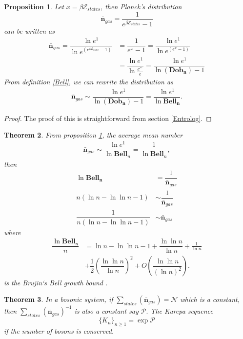 \documentclass[pdflatex,sn-mathphys-num]{sn-jnl}%
\newtheorem{theorem}{Theorem}
\theoremstyle{thmstyleone}%
\newtheorem{proposition}[theorem]{Proposition}%
\theoremstyle{thmstyletwo}%
\theoremstyle{thmstylethree}%
\begin{document}
\begin{proposition}\label{planck}
Let $x=\beta\mathcal{E}_{states}$, then Planck's distribution $$ \bar{\mathbf{n}}_{gas}=\dfrac{1}{e^{\beta \mathcal{E}_{states}}-1}$$ can be written as
\begin{align*}
\bar{\mathbf{n}}_{gas}=\dfrac{\ln{e^1}}{\ln{e^{(e^{\beta\mathcal{E}_{state}}-1)}}}&=\dfrac{1}{e^{x}-1}=\dfrac{\ln{e^1}}{\ln{e^{(e^{x}-1)}}}\\
&=\dfrac{\ln{e^1}}{\ln{\frac{e^{e^x}}{e}}}=\dfrac{\ln{e^1}}{\ln(\mathbf{Dob_n})-1}      
\end{align*}
From definition \ref{Bell}, we can rewrite the distribution as 
\begin{align*}
    \bar{\mathbf{n}}_{gas}\sim\dfrac{\ln{e^1}}{\ln(\mathbf{Dob_n})-1}=\dfrac{\ln{e^1}}{\ln{\mathbf{Bell_n}}}.
\end{align*}
\end{proposition}

\begin{proof}
    The proof of this is straightforward from section \ref{Entrolog}.
\end{proof}

  \begin{theorem}\label{growth}
  From proposition \ref{planck}, the average mean number
      \begin{align*}
    \bar{\mathbf{n}}_{gas}\sim\dfrac{\ln{e^1}}{\ln{\mathbf{Bell}_n}}= \dfrac{1}{\ln{\mathbf{Bell}_n}},
\end{align*}
then
\begin{align*}
\ln\mathbf{Bell_n}&=\dfrac{1}{\bar{\mathbf{n}}_{gas}}\\
n(\ln n - \ln\ln n - 1)&\sim\dfrac{1}{\bar{\mathbf{n}}_{gas}}\\
\dfrac{1}{n(\ln n - \ln\ln n - 1)}&\sim \bar{\mathbf{n}}_{gas}
\end{align*}
where 
\begin{align*}
\dfrac{\ln \mathbf{Bell}_n}{n}&=\ln n-\ln\ln n-1+\dfrac{\ln\ln n}{\ln n}+\frac1{\ln n}\\
&+\dfrac12\left(\dfrac{\ln\ln n}{\ln n}\right)^2+O\left(\dfrac{\ln\ln n}{(\ln n)^2}\right).
\end{align*}
is the Brujin`s Bell growth bound \cite{lovasz2007combinatorial, de2014asymptotic}.
 \end{theorem}  

\begin{theorem}
In a bosonic system, if $\sum_{states}(\bar{\mathbf{n}}_{gas})=\mathcal{N}$ which is a constant, then $\sum_{states}(\bar{\mathbf{n}}_{gas})^{-1}$ is also a constant say $\mathcal{P}.$ The Kurepa sequence 
\begin{equation*}
    \lbrace K_n\rbrace_{n\geq 1}=\exp{\mathcal{P}} 
\end{equation*}
if the number of bosons is conserved. 
\end{theorem}
\end{document}

